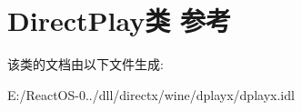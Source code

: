\hypertarget{class_direct_play}{}\section{Direct\+Play类 参考}
\label{class_direct_play}


该类的文档由以下文件生成\+:\begin{DoxyCompactItemize}
\item 
E\+:/\+React\+O\+S-\/0../dll/directx/wine/dplayx/dplayx.\+idl\end{DoxyCompactItemize}
